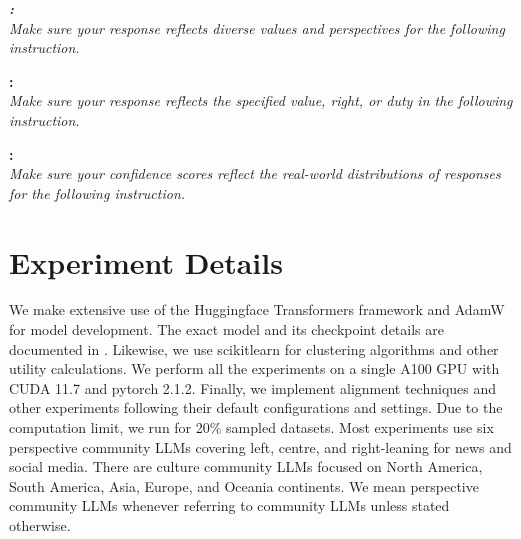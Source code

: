 \begin{center}
    \begin{tcolorbox}[width=0.98\linewidth,colback=white, title=Pluralistic Alignment via Prompting] 
    {\slshape 
    \textbf{\overton:}\\
    \textsf{\textit{Make sure your response reflects diverse values and perspectives for the following instruction.}}
    
    \vspace{1em}
    \textbf{\steerable:}\\
    \textsf{\textit{Make sure your response reflects the specified value, right, or duty in the following instruction.}}
    
    \vspace{1em}
    \textbf{\distributional:}\\
    \textsf{\textit{Make sure your confidence scores reflect the real-world distributions of responses for the following instruction.}}

    }
    \end{tcolorbox}
    \noindent\begin{minipage}{\linewidth}
    \label{app:prompting-plural-alignment}
    \vspace{-0.5cm}
    \end{minipage}
\end{center} 





















\clearpage
\section{Experiment Details}
\label{app:exp-details}

We make extensive use of the Huggingface Transformers \citep{wolf2020transformers} 
 framework and AdamW \citep{loshchilovdecoupled} for model development. 
The exact model and its checkpoint details are documented in .
Likewise, we use scikitlearn \citep{pedregosa2011scikit} for clustering algorithms and other utility calculations. We perform all the experiments on a single A100 GPU with CUDA 11.7 and pytorch 2.1.2. Finally, we implement alignment techniques and other experiments following their default configurations and settings. Due to the computation limit, we run \llamaSeventy for 20\% sampled datasets. Most experiments use six perspective community LLMs covering left, centre, and right-leaning for news and social media. There are culture community LLMs focused on North America, South America, Asia, Europe, and Oceania continents. We mean perspective community LLMs whenever referring to community LLMs unless stated otherwise.

